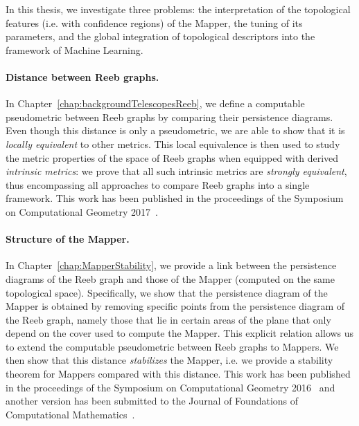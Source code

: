 In this thesis, we investigate
three problems: the interpretation of the topological features (i.e. with confidence regions) of the Mapper,
the tuning of its parameters, and the global integration of topological descriptors into the framework of Machine Learning.


\paragraph*{Distance between Reeb graphs.} 
In Chapter~\ref{chap:backgroundTelescopesReeb}, we define a computable pseudometric between Reeb graphs
by comparing their persistence diagrams.
Even though this distance is only a pseudometric, we are able to show
that it is {\em locally equivalent} to other metrics. This local equivalence is then used to study the metric properties of the space of Reeb graphs
when equipped with derived {\em intrinsic metrics}: we prove that all such intrinsic metrics are {\em strongly equivalent}, thus encompassing 
all approaches to compare Reeb graphs into a single framework. This work has been published in the proceedings of the Symposium on Computational Geometry 2017~\cite{Carriere17a}. 

\paragraph*{Structure of the Mapper.} In Chapter~\ref{chap:MapperStability}, we provide a link between the persistence diagrams of the Reeb graph
and those of the Mapper (computed on the same topological space). 
Specifically, we show that the persistence diagram of the Mapper is obtained by removing specific points
from the persistence diagram of the Reeb graph, namely those that lie in certain areas of the plane that only depend on the cover used to
compute the Mapper. This explicit relation allows us to extend the computable pseudometric between Reeb graphs to Mappers. We then show
that this distance {\em stabilizes} the Mapper, i.e. we provide a stability theorem for Mappers compared with this distance. 
This work has been published in the proceedings of the Symposium on Computational Geometry 2016~\cite{Carriere16} and 
another version has been submitted to the Journal of Foundations of Computational Mathematics~\cite{Carriere15c}.


